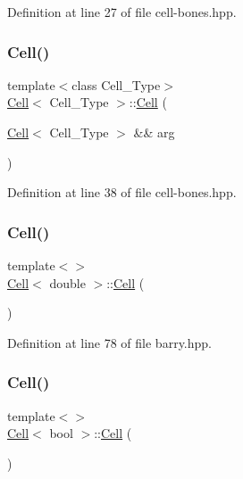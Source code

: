 Definition at line 27 of file cell-\/bones.\+hpp.

\mbox{\label{class_cell_abe27b0c411864d9fce33a1cffe918169}} 
\subsubsection{\texorpdfstring{Cell()}{Cell()}\hspace{0.1cm}{\footnotesize\ttfamily [5/9]}}
{\footnotesize\ttfamily template$<$class Cell\+\_\+\+Type$>$ \\
\hyperlink{class_cell}{Cell}$<$ Cell\+\_\+\+Type $>$\+::\hyperlink{class_cell}{Cell} (\begin{DoxyParamCaption}\item[{\hyperlink{class_cell}{Cell}$<$ Cell\+\_\+\+Type $>$ \&\&}]{arg }\end{DoxyParamCaption})\hspace{0.3cm}{\ttfamily [inline]}}



Definition at line 38 of file cell-\/bones.\+hpp.

\mbox{\label{class_cell_a5ecdaddaf4661a9a8fe6f0ed61595847}} 
\subsubsection{\texorpdfstring{Cell()}{Cell()}\hspace{0.1cm}{\footnotesize\ttfamily [6/9]}}
{\footnotesize\ttfamily template$<$$>$ \\
\hyperlink{class_cell}{Cell}$<$ double $>$\+::\hyperlink{class_cell}{Cell} (\begin{DoxyParamCaption}{ }\end{DoxyParamCaption})\hspace{0.3cm}{\ttfamily [inline]}}



Definition at line 78 of file barry.\+hpp.

\mbox{\label{class_cell_aef4b64101b33e2349ceea132b962d137}} 
\subsubsection{\texorpdfstring{Cell()}{Cell()}\hspace{0.1cm}{\footnotesize\ttfamily [7/9]}}
{\footnotesize\ttfamily template$<$$>$ \\
\hyperlink{class_cell}{Cell}$<$ bool $>$\+::\hyperlink{class_cell}{Cell} (\begin{DoxyParamCaption}{ }\end{DoxyParamCaption})\hspace{0.3cm}{\ttfamily [inline]}}




